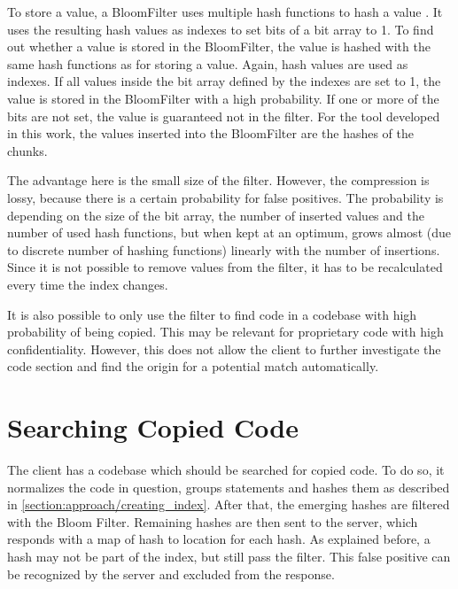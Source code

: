 To store a value, a BloomFilter uses multiple hash functions to hash a value \cite{bloom1970filter}.
It uses the resulting hash values as indexes to set bits of a bit array to 1.
To find out whether a value is stored in the BloomFilter, the value is hashed with the same hash functions as for storing a value.
Again, hash values are used as indexes.
If all values inside the bit array defined by the indexes are set to 1, the value is stored in the BloomFilter with a high probability.
If one or more of the bits are not set, the value is guaranteed not in the filter.
For the tool developed in this work, the values inserted into the BloomFilter are the hashes of the chunks.

The advantage here is the small size of the filter.
However, the compression is lossy, because there is a certain probability for false positives.
The probability is depending on the size of the bit array, the number of inserted values and the number of used hash functions, but when kept at an optimum, grows almost (due to discrete number of hashing functions) linearly with the number of insertions.
Since it is not possible to remove values from the filter, it has to be recalculated every time the index changes.

It is also possible to only use the filter to find code in a codebase with high probability of being copied.
This may be relevant for proprietary code with high confidentiality.
However, this does not allow the client to further investigate the code section and find the origin for a potential match automatically.
	
\section{Searching Copied Code}\label{section:approach/searching_copied_code}
The client has a codebase which should be searched for copied code.
To do so, it normalizes the code in question, groups statements and hashes them as described in \autoref{section:approach/creating_index}.
After that, the emerging hashes are filtered with the Bloom Filter.
Remaining hashes are then sent to the server, which responds with a map of hash to location for each hash.
As explained before, a hash may not be part of the index, but still pass the filter.
This false positive can be recognized by the server and excluded from the response.


